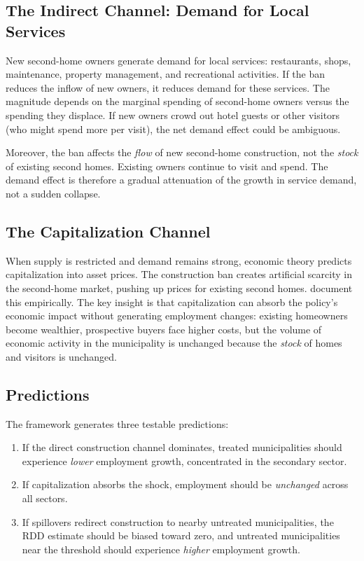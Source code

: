 \documentclass[12pt]{article}
\begin{document}
\subsection{The Indirect Channel: Demand for Local Services}

New second-home owners generate demand for local services: restaurants, shops, maintenance, property management, and recreational activities. If the ban reduces the inflow of new owners, it reduces demand for these services. The magnitude depends on the marginal spending of second-home owners versus the spending they displace. If new owners crowd out hotel guests or other visitors (who might spend more per visit), the net demand effect could be ambiguous.

Moreover, the ban affects the \textit{flow} of new second-home construction, not the \textit{stock} of existing second homes. Existing owners continue to visit and spend. The demand effect is therefore a gradual attenuation of the growth in service demand, not a sudden collapse.

\subsection{The Capitalization Channel}

When supply is restricted and demand remains strong, economic theory predicts capitalization into asset prices. The construction ban creates artificial scarcity in the second-home market, pushing up prices for existing second homes. \citet{hilber2019} document this empirically. The key insight is that capitalization can absorb the policy's economic impact without generating employment changes: existing homeowners become wealthier, prospective buyers face higher costs, but the volume of economic activity in the municipality is unchanged because the \textit{stock} of homes and visitors is unchanged.

\subsection{Predictions}

The framework generates three testable predictions:
\begin{enumerate}
\item If the direct construction channel dominates, treated municipalities should experience \textit{lower} employment growth, concentrated in the secondary sector.
\item If capitalization absorbs the shock, employment should be \textit{unchanged} across all sectors.
\item If spillovers redirect construction to nearby untreated municipalities, the RDD estimate should be biased toward zero, and untreated municipalities near the threshold should experience \textit{higher} employment growth.
\end{enumerate}
\end{document}
